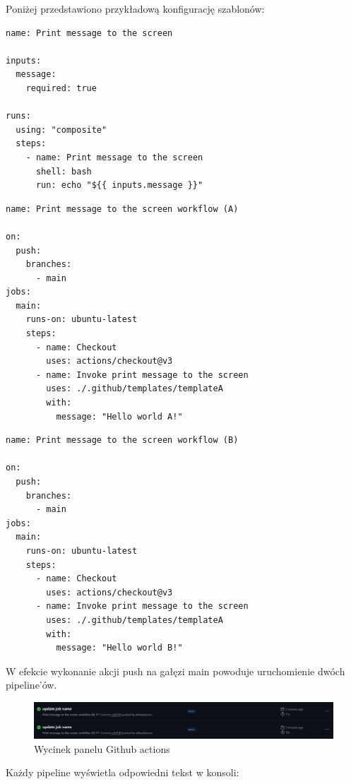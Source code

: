 \documentclass{article}
\begin{document}
Poniżej przedstawiono przykładową konfigurację szablonów:

\begin{lstlisting}[caption=Plik \lstinline|.github/templates/templateA/action.yml|]
name: Print message to the screen

inputs:
  message:
    required: true

runs:
  using: "composite"
  steps:
    - name: Print message to the screen
      shell: bash
      run: echo "${{ inputs.message }}"
\end{lstlisting}

\begin{lstlisting}[caption=Plik \lstinline|.github/workflows/workflowA.yml|]
name: Print message to the screen workflow (A)

on:
  push:
    branches:
      - main
jobs:
  main:
    runs-on: ubuntu-latest
    steps:
      - name: Checkout
        uses: actions/checkout@v3
      - name: Invoke print message to the screen
        uses: ./.github/templates/templateA
        with:
          message: "Hello world A!"
\end{lstlisting}

\begin{lstlisting}[caption=Plik \lstinline|.github/workflows/workflowB.yml|]
name: Print message to the screen workflow (B)

on:
  push:
    branches:
      - main
jobs:
  main:
    runs-on: ubuntu-latest
    steps:
      - name: Checkout
        uses: actions/checkout@v3
      - name: Invoke print message to the screen
        uses: ./.github/templates/templateA
        with:
          message: "Hello world B!"
\end{lstlisting}

W efekcie wykonanie akcji push na gałęzi main powoduje uruchomienie dwóch pipeline’ów.

\begin{figure}[H]
    \centering
    \includegraphics[width=1\linewidth]{testPipelinesInGithubActionsDashboard.png}
    \caption{Wycinek panelu Github actions}
    \label{fig:enter-label}
\end{figure}

Każdy pipeline wyświetla odpowiedni tekst w konsoli:
\end{document}
